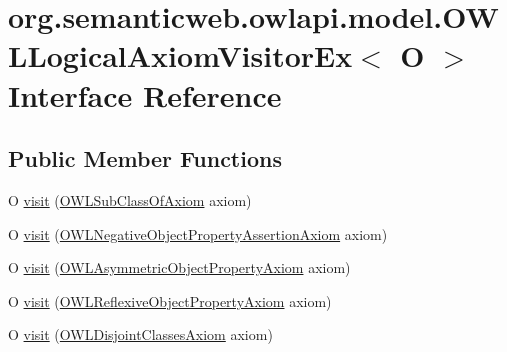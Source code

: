 \hypertarget{interfaceorg_1_1semanticweb_1_1owlapi_1_1model_1_1_o_w_l_logical_axiom_visitor_ex_3_01_o_01_4}{\section{org.\-semanticweb.\-owlapi.\-model.\-O\-W\-L\-Logical\-Axiom\-Visitor\-Ex$<$ O $>$ Interface Reference}
\label{interfaceorg_1_1semanticweb_1_1owlapi_1_1model_1_1_o_w_l_logical_axiom_visitor_ex_3_01_o_01_4}
}
\subsection*{Public Member Functions}
\begin{DoxyCompactItemize}
\item 
O \hyperlink{interfaceorg_1_1semanticweb_1_1owlapi_1_1model_1_1_o_w_l_logical_axiom_visitor_ex_3_01_o_01_4_ae8b914fa53c9398e329b1ee3cc333b26}{visit} (\hyperlink{interfaceorg_1_1semanticweb_1_1owlapi_1_1model_1_1_o_w_l_sub_class_of_axiom}{O\-W\-L\-Sub\-Class\-Of\-Axiom} axiom)
\item 
O \hyperlink{interfaceorg_1_1semanticweb_1_1owlapi_1_1model_1_1_o_w_l_logical_axiom_visitor_ex_3_01_o_01_4_a899f90321ffdf624ac97efb97c261f95}{visit} (\hyperlink{interfaceorg_1_1semanticweb_1_1owlapi_1_1model_1_1_o_w_l_negative_object_property_assertion_axiom}{O\-W\-L\-Negative\-Object\-Property\-Assertion\-Axiom} axiom)
\item 
O \hyperlink{interfaceorg_1_1semanticweb_1_1owlapi_1_1model_1_1_o_w_l_logical_axiom_visitor_ex_3_01_o_01_4_a662f74099a7215cf42d7e25a843dace4}{visit} (\hyperlink{interfaceorg_1_1semanticweb_1_1owlapi_1_1model_1_1_o_w_l_asymmetric_object_property_axiom}{O\-W\-L\-Asymmetric\-Object\-Property\-Axiom} axiom)
\item 
O \hyperlink{interfaceorg_1_1semanticweb_1_1owlapi_1_1model_1_1_o_w_l_logical_axiom_visitor_ex_3_01_o_01_4_a998fe9db0d73326cfbd0d8633fd97f76}{visit} (\hyperlink{interfaceorg_1_1semanticweb_1_1owlapi_1_1model_1_1_o_w_l_reflexive_object_property_axiom}{O\-W\-L\-Reflexive\-Object\-Property\-Axiom} axiom)
\item 
O \hyperlink{interfaceorg_1_1semanticweb_1_1owlapi_1_1model_1_1_o_w_l_logical_axiom_visitor_ex_3_01_o_01_4_a8b9da649d5113a1e37a7315f74ea2182}{visit} (\hyperlink{interfaceorg_1_1semanticweb_1_1owlapi_1_1model_1_1_o_w_l_disjoint_classes_axiom}{O\-W\-L\-Disjoint\-Classes\-Axiom} axiom)

\end{DoxyCompactItemize}
